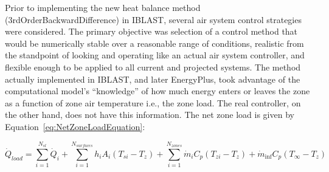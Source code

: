 Prior to implementing the new heat balance method (3rdOrderBackwardDifference) in IBLAST, several air system control strategies were considered. The primary objective was selection of a control method that would be numerically stable over a reasonable range of conditions, realistic from the standpoint of looking and operating like an actual air system controller, and flexible enough to be applied to all current and projected systems. The method actually implemented in IBLAST, and later EnergyPlus, took advantage of the computational model's ``knowledge'' of how much energy enters or leaves the zone as a function of zone air temperature i.e., the zone load. The real controller, on the other hand, does not have this information. The net zone load is given by Equation~\ref{eq:NetZoneLoadEquation}:

\begin{equation}
{\dot Q_{load}} = \sum\limits_{i = 1}^{{N_{sl}}} {\dot Q_i^{}}  + \sum\limits_{i = 1}^{{N_{surfaces}}} {{h_i}} {A_i}\left( {{T_{si}} - {T_z}} \right) + \sum\limits_{i = 1}^{{N_{zones}}} {{{\dot m}_i}} {C_p}\left( {{T_{zi}} - {T_z}} \right) + {\dot m_{\inf }}{C_p}\left( {{T_\infty } - {T_z}} \right)
\label{eq:NetZoneLoadEquation}
\end{equation}

